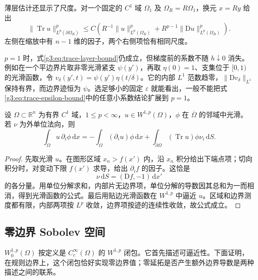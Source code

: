 薄层估计还显示了尺度。对一个固定的 \(C^1\) 域 \(\Omega_1\) 及 \(\Omega_R=R\Omega_1\)，换元 \(x=Ry\) 给出
\[
	\|\operatorname{Tr}u\|_{L^p(\partial\Omega_R)}^p
	\le C\left(R^{-1}\|u\|_{L^p(\Omega_R)}^p
	+R^{p-1}\|\mathrm Du\|_{L^p(\Omega_R)}^p\right).
\]
左侧在缩放中有 \(n-1\) 维的因子，两个右侧项恰有相同尺度。

\ProseParagraphBreak

\(p=1\) 时，式\eqref{g3:eq:trace-layer-bound}仍成立，但梯度前的系数不随 \(h\downarrow0\) 消失。例如在一个平边界片取非零光滑紧支 \(\psi(y')\)，再取 \(\eta(0)=1\)、支集位于 \([0,1)\) 的光滑函数，令 \(v_\delta(y',t)=\psi(y')\eta(t/\delta)\)。它的内部 \(L^1\) 范数趋零，\(\|\mathrm Dv_\delta\|_{L^1}\) 保持有界，而边界迹恒为 \(\psi\)。选足够小的固定 \(\varepsilon\) 就能看出，一般不能把式\eqref{g3:eq:trace-epsilon-bound}中的任意小系数结论扩展到 \(p=1\)。

\begin{proposition}\label{g3:prop:weak-boundary-integration}
	设 \(\Omega\subset\mathbb R^n\) 为有界 \(C^1\) 域，\(1\le p<\infty\)，\(u\in W^{1,p}(\Omega)\)，\(\phi\) 在 \(\overline\Omega\) 的邻域中光滑。若 \(\nu\) 为外单位法向，则
	\begin{equation}\label{g3:eq:weak-boundary-integration}
		\int_\Omega u\,\partial_i\phi\,\mathrm dx
		=-\int_\Omega(\partial_i u)\phi\,\mathrm dx
		+\int_{\partial\Omega}(\operatorname{Tr}u)\phi\nu_i\,\mathrm dS.
	\end{equation}
\end{proposition}
\begin{proof}
	先取光滑 \(u\)。在图形区域 \(x_n>f(x')\) 内，沿 \(x_n\) 积分给出下端点项；切向积分时，对变动下限 \(f(x')\) 求导，给出 \(\partial_i f\) 的因子。这恰是
	\[
		\nu\,\mathrm dS=(\mathrm Df,-1)\,\mathrm dx'
	\]
	的各分量。用单位分解求和，内部片无边界项，单位分解的导数因其总和为一而相消，得到光滑函数的公式。最后用贴边光滑函数在 \(W^{1,p}\) 中逼近 \(u\)。区域和边界测度都有限，内部两项按 \(L^p\) 收敛，边界项按迹的连续性收敛，故公式成立。
\end{proof}

\subsection{零边界 Sobolev 空间}
\label{g3:subsec:1106:03}
\(W_0^{1,p}(\Omega)\) 按定义是 \(C_c^\infty(\Omega)\) 的 \(W^{1,p}\) 闭包。它首先描述可逼近性。下面证明，在规则边界上，这个闭包恰好实现零边界值；零延拓是否产生额外边界导数是两种描述之间的联系。

